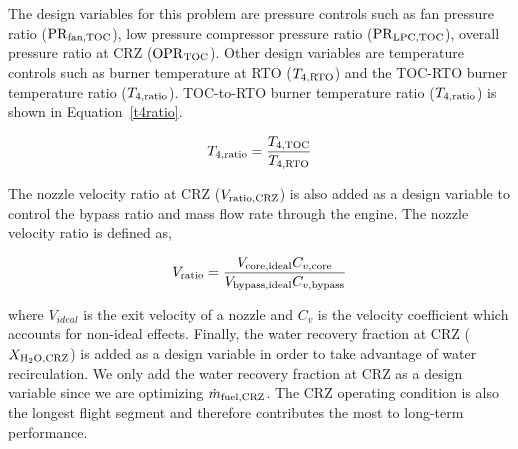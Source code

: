 \documentclass[conf]{new-aiaa}
\begin{document}

The design variables for this problem are pressure controls such as fan pressure ratio ($\rm{PR}_{\rm{fan,TOC}}$), low pressure compressor pressure ratio ($\rm{PR}_{\rm{LPC,TOC}}$), overall pressure ratio at CRZ ($\rm{OPR}_{\rm{TOC}}$).
Other design variables are temperature controls such as burner temperature at RTO ($T_{4,\rm{RTO}}$) and the TOC-RTO burner temperature ratio ($T_{4,\rm{ratio}}$).
TOC-to-RTO burner temperature ratio ($T_{4,\rm{ratio}}$) is shown in Equation~\eqref{t4ratio}.

\begin{equation}
  T_{4,\rm{ratio}} = \frac{T_{4,\rm{TOC}}}{T_{4,\rm{RTO}}}
  \label{t4ratio}
\end{equation}

\noindent
The nozzle velocity ratio at CRZ ($V_{\rm{ratio,CRZ}}$) is also added as a design variable to control the bypass ratio and mass flow rate through the engine.
The nozzle velocity ratio is defined as,

\begin{equation}
  V_{\rm{ratio}} = \frac{V_{\rm{core,ideal}}C_{v,\rm{core}}}{V_{\rm{bypass,ideal}}C_{v,\rm{bypass}}}
  \label{eq:vratio}
\end{equation}

\noindent
where $V_{ideal}$ is the exit velocity of a nozzle and $C_v$ is the velocity coefficient which accounts for non-ideal effects.
Finally, the water recovery fraction at CRZ ($X_{\rm{H_2O,CRZ}}$) is added as a design variable in order to take advantage of water recirculation.
We only add the water recovery fraction at CRZ as a design variable since we are optimizing $\dot{m}_{\rm{fuel,CRZ}}$.
The CRZ operating condition is also the longest flight segment and therefore contributes the most to long-term performance.
\end{document}
